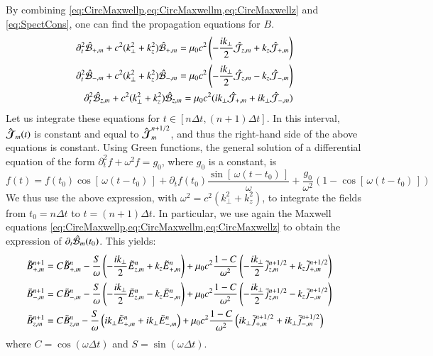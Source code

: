 By combining \cref{eq:CircMaxwellp,eq:CircMaxwellm,eq:CircMaxwellz}
and \cref{eq:SpectCons}, one can find the propagation equations for $B$.
\begin{subequations}
\begin{align}
\partial_t^2 \hat{\mathcal{B}}_{+,m} + c^2(k_\perp ^2+k_z^2) \hat{\mathcal{B}}_{+,m} = 
\mu_0 c^2 \left( - \frac{ik_\perp }{2} \hat{\mathcal{J}}_{z,m} + k_z \hat{\mathcal{J}}_{+,m}
\right) \\
\partial_t^2 \hat{\mathcal{B}}_{-,m} + c^2(k_\perp ^2+k_z^2) \hat{\mathcal{B}}_{-,m} = 
\mu_0 c^2 \left( - \frac{ik_\perp }{2} \hat{\mathcal{J}}_{z,m} - k_z \hat{\mathcal{J}}_{-,m}
\right) \\
\partial_t^2 \hat{\mathcal{B}}_{z,m} + c^2(k_\perp ^2+k_z^2) \hat{\mathcal{B}}_{z,m} =
\mu_0c^2  (ik_\perp  \hat{\mathcal{J}}_{+,m} + ik_\perp \hat{\mathcal{J}}_{-,m} ) 
\end{align}
\end{subequations}
Let us integrate these equations for $t\in [n\Delta t, (n+1)\Delta
t]$. In this interval, $\boldsymbol{\hat{\mathcal{J}}}_m(t)$ is constant
and equal to $\boldsymbol{\hat{\mathcal{J}}}_m^{n+1/2}$, and thus the right-hand side of the above
equations is constant. Using Green functions, the
general solution of a differential equation of the form 
$\partial_t^2 f + \omega^2 f = g_0$, where $g_0$ is a constant, is 
\begin{equation} f(t) = f(t_0) \cos[\,\omega (t-t_0)\,] + \partial_t f (t_0) \frac{
  \sin[\,\omega (t-t_0)\,]  }{\omega} + \frac{g_0}{\omega^2} (1-
\cos[\,\omega (t-t_0)\,] ) \end{equation}  
We thus use the above expression, with $\omega^2 =c^2(k_\perp^2 +
k_z^2)$, to integrate the fields from $t_0 = n\Delta t$ to $t=(n+1)\Delta t$. In
particular, we use again the Maxwell equations
\cref{eq:CircMaxwellp,eq:CircMaxwellm,eq:CircMaxwellz} to obtain the
expression of $\partial_t \hat{\mathcal{B}}_{m} (t_0)$. This yields:
\begin{subequations}
\begin{align}
\tilde{B}_{+,m}^{n+1} = \; & C \tilde{B}_{+,m}^{n} - 
\frac{S}{\omega}\left(-\frac{ik_\perp }{2} \tilde{E}_{z,m}^{n} + k_z\tilde{E}_{+,m}^{n}
\right) + \mu_0 c^2\frac{1-C}{\omega^2} \left( -\frac{ik_\perp }{2}
  \tilde{j}_{z,m}^{n+1/2} + k_z \tilde{j}_{+,m}^{n+1/2} \right)& \\
\tilde{B}_{-,m}^{n+1} =\; & C \tilde{B}_{-,m}^{n} - 
\frac{S}{\omega}\left(- \frac{ik_\perp }{2} \tilde{E}_{z,m}^{n} - k_z\tilde{E}_{-,m}^{n}
\right) + \mu_0 c^2\frac{1-C}{\omega^2} \left( - \frac{ik_\perp }{2}
  \tilde{j}_{z,m}^{n+1/2} - k_z \tilde{j}_{-,m}^{n+1/2} \right) &\\
\tilde{B}_{z,m}^{n+1} =\; & C \tilde{B}_{z,m}^{n} - 
\frac{S}{\omega}\left(ik_\perp \tilde{E}_{+,m}^{n} + ik_\perp \tilde{E}_{-,m}^{n}
\right) + \mu_0 c^2\frac{1-C}{\omega^2} \left( ik_\perp
  \tilde{j}_{+,m}^{n+1/2} + ik_\perp \tilde{j}_{-,m}^{n+1/2} \right)&
\end{align}
\end{subequations}
where $C = \cos(\omega \Delta t)$ and $S = \sin(\omega \Delta t) $.

